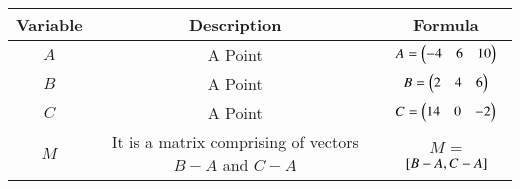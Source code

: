 \begin{center}
    \begin{tabular}{|c|c|c|} 
        \hline
            \textbf{Variable} & \textbf{Description} & \textbf{Formula} \\ 
        \hline
            $A$   & A Point & $A = \begin{pmatrix}-4 & 6 & 10\end{pmatrix}$ \\ 
        \hline
            $B$   & A Point &  $B = \begin{pmatrix}2 & 4 & 6\end{pmatrix}$\\ 
        \hline
            $C$   & A Point & $C  = \begin{pmatrix}14& 0& -2\end{pmatrix}$\\ 
        \hline
            $M$   & It is a matrix comprising of vectors $B-A$ and $C-A$ & $M$ = \textbf{${}\left[B-A,C-A\right]$}\\ 
        \hline
    \end{tabular}
\end{center}  



